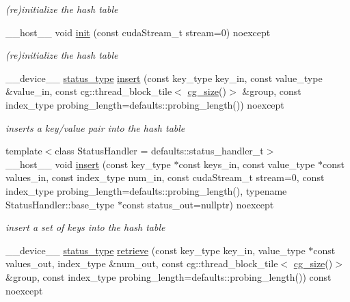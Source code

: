 \begin{DoxyCompactItemize}
\begin{DoxyCompactList}\small\item\em (re)initialize the hash table \end{DoxyCompactList}\item 
\+\_\+\+\_\+host\+\_\+\+\_\+ void \hyperlink{classwarpcore_1_1BucketListHashTable_ad8b42b071bdf053a1ccd42b001212fc6}{init} (const cuda\+Stream\+\_\+t stream=0) noexcept
\begin{DoxyCompactList}\small\item\em (re)initialize the hash table \end{DoxyCompactList}\item 
\+\_\+\+\_\+device\+\_\+\+\_\+ \hyperlink{classwarpcore_1_1Status}{status\+\_\+type} \hyperlink{classwarpcore_1_1BucketListHashTable_afd7403fb1e7a22bdf59b7f6143c1f420}{insert} (const key\+\_\+type key\+\_\+in, const value\+\_\+type \&value\+\_\+in, const cg\+::thread\+\_\+block\+\_\+tile$<$ \hyperlink{classwarpcore_1_1BucketListHashTable_a3807ac1b39b47617d862c5dd17f21330}{cg\+\_\+size}()$>$ \&group, const index\+\_\+type probing\+\_\+length=defaults\+::probing\+\_\+length()) noexcept
\begin{DoxyCompactList}\small\item\em inserts a key/value pair into the hash table \end{DoxyCompactList}\item 
{\footnotesize template$<$class Status\+Handler  = defaults\+::status\+\_\+handler\+\_\+t$>$ }\\\+\_\+\+\_\+host\+\_\+\+\_\+ void \hyperlink{classwarpcore_1_1BucketListHashTable_a5fa1b9eaaa90ae795c81e81f07da7f73}{insert} (const key\+\_\+type $\ast$const keys\+\_\+in, const value\+\_\+type $\ast$const values\+\_\+in, const index\+\_\+type num\+\_\+in, const cuda\+Stream\+\_\+t stream=0, const index\+\_\+type probing\+\_\+length=defaults\+::probing\+\_\+length(), typename Status\+Handler\+::base\+\_\+type $\ast$const status\+\_\+out=nullptr) noexcept
\begin{DoxyCompactList}\small\item\em insert a set of keys into the hash table \end{DoxyCompactList}\item 
\+\_\+\+\_\+device\+\_\+\+\_\+ \hyperlink{classwarpcore_1_1Status}{status\+\_\+type} \hyperlink{classwarpcore_1_1BucketListHashTable_aaec71d3af4c78150ca47a50adf0dd054}{retrieve} (const key\+\_\+type key\+\_\+in, value\+\_\+type $\ast$const values\+\_\+out, index\+\_\+type \&num\+\_\+out, const cg\+::thread\+\_\+block\+\_\+tile$<$ \hyperlink{classwarpcore_1_1BucketListHashTable_a3807ac1b39b47617d862c5dd17f21330}{cg\+\_\+size}()$>$ \&group, const index\+\_\+type probing\+\_\+length=defaults\+::probing\+\_\+length()) const noexcept

\end{DoxyCompactItemize}
